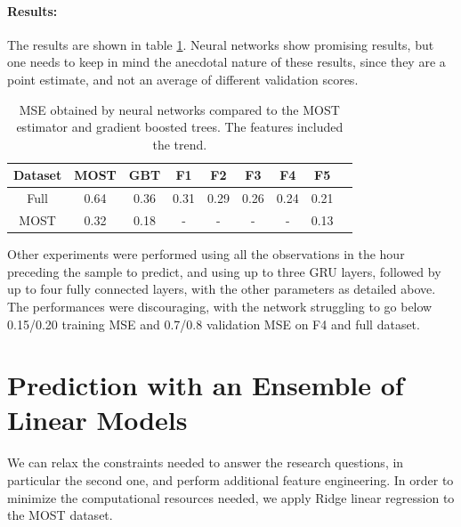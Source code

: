 \documentclass[a4paper,11pt]{kth-mag}
\begin{document}
\paragraph{Results:}
The results are shown in table \ref{tbl:nnets}. Neural networks show promising results, but one needs to keep in mind the anecdotal nature of these results, since they are a point estimate, and not an average of different validation scores.

\begin{table}
\caption{MSE obtained by neural networks compared to the MOST estimator and gradient boosted trees. The features included the trend.}
\label{tbl:nnets}
\centering
\begin{tabular}{ccc|cccccc}
\toprule
\textbf{Dataset} & \textbf{MOST} & \textbf{GBT} & \textbf{F1} & \textbf{F2} & \textbf{F3} & \textbf{F4} & \textbf{F5} \\
\midrule
Full & 0.64 & 0.36 & 0.31 & 0.29 & 0.26 & 0.24 & 0.21 \\
MOST & 0.32 & 0.18 & - & - & - & - & 0.13 \\
\bottomrule
\end{tabular}
\end{table}

Other experiments were performed using all the observations in the hour preceding the sample to predict, and using up to three GRU layers, followed by up to four fully connected layers, with the other parameters as detailed above. The performances were discouraging, with the network struggling to go below 0.15/0.20 training MSE and 0.7/0.8 validation MSE on F4 and full dataset.

\section{Prediction with an Ensemble of Linear Models}
\label{apx:linear_ensemble}
We can relax the constraints needed to answer the research questions, in particular the second one, and perform additional feature engineering. In order to minimize the computational resources needed, we apply Ridge linear regression to the MOST dataset.
\end{document}
